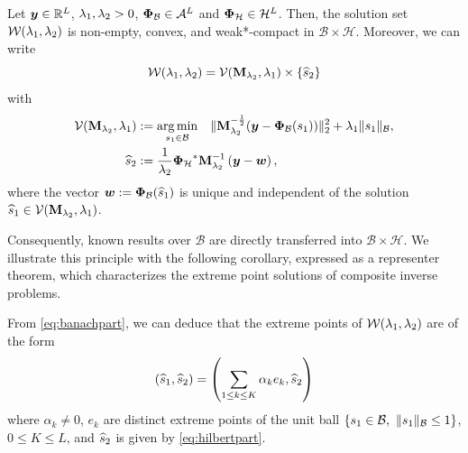 \documentclass[12pt]{article}
\begin{document}
    \begin{theorem} \label{theo:main}
     Let $\bm{y}\in \mathbb{R}^L$, $\lambda_1, \lambda_{2} > 0$, ${\bm{\Phi}_\mathcal{B}} \in \mathcal{A}^L$ and ${\bm{\Phi}_\mathcal{H}} \in \mathcal{H}^L$.
     Then, the solution set $\mathcal{W} (\lambda_{1},\lambda_{2})$
    is non-empty, convex, and weak*-compact in $\mathcal{B}\times \mathcal{H}$. Moreover, we can write
    \begin{equation}
        \label{eq:decoupling}
        \mathcal{W} (\lambda_{1},\lambda_{2}) = \mathcal{V}(\mathbf{M}_{\lambda_{2}},\lambda_{1}) \times \{\widehat{s}_2\}
    \end{equation}
    with
    \begin{align}
        \mathcal{V}(\mathbf{M}_{\lambda_{2}},\lambda_{1}) &:= \underset{ s_1 \in \mathcal{B}}{\arg\min} \quad \|\mathbf{M}_{\lambda_{2}}^{-\frac{1}{2}} ( \bm{y} - {\bm{\Phi}_\mathcal{B}}(s_1)  ) \|_2^2  + \lambda_{1} \| s_1 \|_{\mathcal{B}} , \label{eq:banachpart} \\
        \widehat{s}_2 &:=  \frac{1}{\lambda_{2}}{\bm{\Phi}_\mathcal{H}}^* \mathbf{M}_{\lambda_{2}}^{-1} \left(\bm{y} - \bm{w}\right), \label{eq:hilbertpart}
    \end{align}
    where the vector $\bm{w} := {\bm{\Phi}_\mathcal{B}} ( \widehat{s}_1)$ is unique and independent of the solution $\widehat{s}_1 \in \mathcal{V}(\mathbf{M}_{\lambda_{2}},\lambda_{1})$. 
    \end{theorem}

    Consequently, known results over $\mathcal{B}$ are directly transferred into $\mathcal{B}\times \mathcal{H}$. We illustrate this principle with the following corollary, expressed as a representer theorem, which characterizes the extreme point solutions of composite inverse problems.

    \begin{corollary}
    From \eqref{eq:banachpart}, we can deduce that the extreme points of $\mathcal{W} (\lambda_{1},\lambda_{2})$ are of the form 
    \begin{equation} \label{eq:extreme}
        (\widehat{s}_1 , \widehat{s}_2 ) = \left( \sum_{1 \leq k \leq K} \alpha_k e_k , \widehat{s}_2 \right)
    \end{equation}
    where $\alpha_k \neq 0$, $e_k$ are distinct extreme points of the unit ball $\{ s_1 \in \mathcal{B}, \ \| s_1 \|_{\mathcal{B}} \leq 1\}$, $0 \leq K \leq L$, and $\widehat{s}_2$ is given by \eqref{eq:hilbertpart}. 
    \end{corollary}
\end{document}
